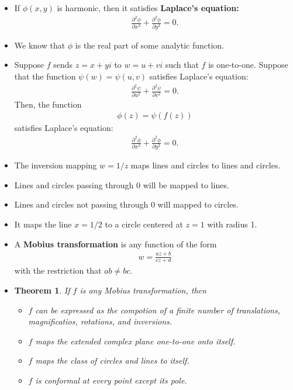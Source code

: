 \documentclass[10pt]{article}
\newtheorem{theorem}[lemma]{Theorem}
\begin{document}
  \begin{itemize}
    \item If $\phi(x,y)$ is harmonic, then it satisfies {\bf Laplace's equation:}
    \begin{align*}
      \frac{\partial^2 \phi}{\partial x^2} + \frac{\partial^2 \phi}{\partial y^2} = 0.
    \end{align*}

    \item We know that $\phi$ is the real part of some analytic function.

    \item Suppose $f$ sends $z = x+yi$ to $w = u+vi$ such that $f$ is one-to-one. Suppose that the function $\psi(w) = \psi(u,v)$ satisfies Laplace's equation:
    \begin{align*}
      \frac{\partial^2 \psi}{\partial u^2} + \frac{\partial^2 \psi}{\partial v^2} = 0.
    \end{align*}
    Then, the function
    \begin{align*}
      \phi(z) = \psi(f(z))
    \end{align*}
    satisfies Laplace's equation:
    \begin{align*}
      \frac{\partial^2 \phi}{\partial x^2} + \frac{\partial^2 \phi}{\partial y^2} = 0.
    \end{align*}

    \item The inversion mapping $w = 1/z$ maps lines and circles to lines and circles.

    \item Lines and circles passing through 0 will be mapped to lines.

    \item Lines and circles not passing through 0 will mapped to circles.

    \item It maps the line $x = 1/2$ to a circle centered at $z = 1$ with radius 1.

    \item A {\bf Mobius transformation} is any function of the form
    \begin{align*}
      w = \frac{az+b}{cz+d}
    \end{align*}
    with the restriction that $ab \neq bc$.

    \item \begin{theorem}
      If $f$ is any Mobius transformation, then
      \begin{itemize}
        \item $f$ can be expressed as the compotion of a finite number of translations, magnificatios, rotations, and inversions.
        \item $f$ maps the extended complex plane one-to-one onto itself.
        \item $f$ maps the class of circles and lines to itself.
        \item $f$ is conformal at every point except its pole.
      \end{itemize}
    \end{theorem}
  \end{itemize}
  

  
  
\end{document}
